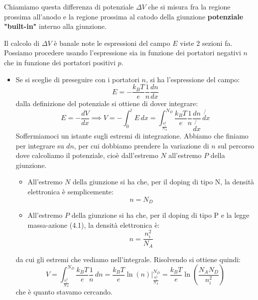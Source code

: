 \documentclass[a4paper,11pt]{article}
\begin{document}
Chiamiamo questa differenza di potenziale $\Delta V$ che si misura fra la regione prossima all'anodo e la regione prossima al catodo della giunzione \textbf{potenziale "built-in"} interno alla giunzione.

Il calcolo di $\Delta V$ è banale note le espressioni del campo $E$ viste 2 sezioni fa. Possiamo procedere usando l'espressione sia in funzione dei portatori negativi $n$ che in funzione dei portatori positivi $p$.

\begin{itemize}
	\item Se si sceglie di preseguire con i portatori $n$, si ha l'espressione del campo:
$$
E = -\frac{k_B T}{e} \frac{1}{n} \frac{dn}{dx} 
$$
dalla definizione del potenziale si ottiene di dover integrare:
$$
E = -\frac{dV}{dx} \implies V = - \int_0^l E \, dx =  \int^{N_D}_{\frac{n_i^2}{N_A}} \frac{k_B T}{e} \frac{1}{n} \frac{dn}{\not{dx}} \, \not{dx}
$$
Soffermiamoci un istante sugli estremi di integrazione. Abbiamo che finiamo per integrare su $dn$, per cui dobbiamo prendere la variazione di $n$ sul percorso dove calcoliamo il potenziale, cioè dall'estremo $N$ all'estremo $P$ della giunzione.
\begin{itemize}
	\item All'estremo $N$ della giunzione si ha che, per il doping di tipo N, la densità elettronica è semplicemente:
		$$
		n = N_D
		$$
	\item All'estremo $P$ della giunzione si ha che, per il doping di tipo P e la legge massa-azione (4.1), la densità elettronica è:
		$$
		n = \frac{n_i^2}{N_A}
		$$
\end{itemize}
da cui gli estremi che vediamo nell'integrale. Risolvendo si ottiene quindi:
$$
V = \int^{N_D}_{\frac{n_i^2}{N_A}} \frac{k_B T}{e} \frac{1}{n} \, dn = \frac{k_B T}{e} \ln(n) \Big|^{N_D}_{\frac{n_i^2}{N_A}} =  \frac{k_B T}{e} \ln \left( \frac{N_A N_D}{n_i^2} \right)
$$
che è quanto stavamo cercando.


\end{itemize}
\end{document}
